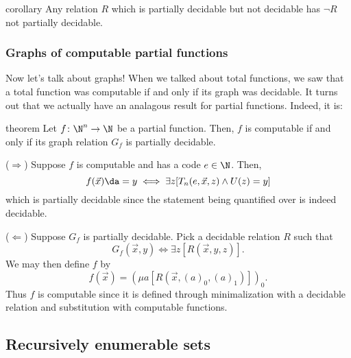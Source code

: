 \documentclass[class=article, crop=false]{standalone}
\begin{document}
\begin{result}{corollary}
  Any relation $R$ which is partially decidable but not decidable has $\lnot R$ not partially decidable.
\end{result}

\subsubsection{Graphs of computable partial functions}

Now let's talk about graphs! When we talked about total functions, we saw that a total function was computable if and only if its graph was decidable. It turns out that we actually have an analagous result for partial functions. Indeed, it is:
\begin{result}{theorem}
  Let $f\colon \N^n \to \N$ be a partial function. Then, $f$ is computable if and only if its graph relation $G_f$ is partially decidable.
\end{result}
\begin{pf}
  ($\Rightarrow$) Suppose $f$ is computable and has a code $e \in \N$. Then,
    \[
      f(\vec x) \da  = y \iff \exists z [T_n(e,\vec x,z) \land U(z) = y]
    \]
  which is partially decidable since the statement being quantified over is indeed decidable.

  ($\Leftarrow$) Suppose $G_f$ is partially decidable. Pick a decidable relation $R$ such that
    \[
      G_f(\vec x,y) \iff \exists z [R(\vec x,y,z)].
    \]
  We may then define $f$ by
    \[
      f(\vec x) = (\mu a[R(\vec x, (a)_0, (a)_1)])_0.
    \]
  Thus $f$ is computable since it is defined through minimalization with a decidable relation and substitution with computable functions.
\end{pf}











\subsection{Recursively enumerable sets}
\end{document}
